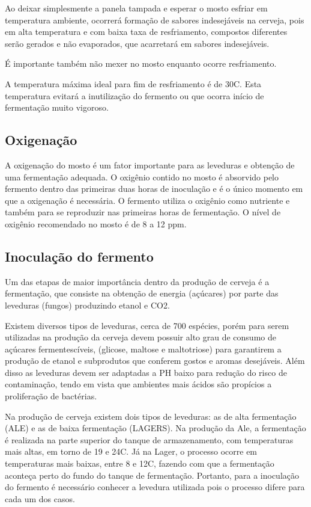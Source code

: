 Ao deixar simplesmente a panela tampada e esperar o mosto esfriar em temperatura ambiente, ocorrerá formação de sabores indesejáveis na cerveja, pois em alta temperatura e com baixa taxa de resfriamento, compostos diferentes serão gerados e não evaporados, que acarretará em sabores indesejáveis.

É importante também não mexer no mosto enquanto ocorre resfriamento.

A temperatura máxima ideal para fim de resfriamento é de 30\textdegree C. Esta temperatura evitará a inutilização do fermento ou que ocorra início de fermentação muito vigoroso.

\subsection{Oxigenação}
 A oxigenação do mosto é um fator importante para as leveduras e obtenção de uma fermentação adequada. O oxigênio contido no mosto é absorvido pelo fermento dentro das primeiras duas horas de inoculação e é o único momento em que a oxigenação é necessária. O fermento utiliza o oxigênio como nutriente e também para se reproduzir nas primeiras horas de fermentação. O nível de oxigênio recomendado no mosto é de 8 a 12 ppm.

 \subsection{Inoculação do fermento}

Um das etapas de maior importância dentro da produção de cerveja é a fermentação, que consiste na obtenção de energia (açúcares) por parte das leveduras (fungos) produzindo etanol e CO2.

Existem diversos tipos de leveduras, cerca de 700 espécies, porém para serem utilizadas na produção da cerveja devem possuir alto grau de consumo de açúcares fermentescíveis, (glicose, maltose e maltotriose) para garantirem a produção de etanol e subprodutos que conferem gostos e aromas desejáveis. Além disso as leveduras devem ser adaptadas a PH baixo para redução do risco de contaminação, tendo em vista que ambientes mais ácidos são propícios a proliferação de bactérias.

Na produção de cerveja existem dois tipos de leveduras: as de alta fermentação (ALE) e as de baixa fermentação (LAGERS). Na produção da Ale, a fermentação é realizada na parte superior do tanque de armazenamento, com temperaturas mais altas, em torno de 19 e 24\textdegree C. Já na Lager, o processo ocorre em temperaturas mais baixas, entre 8 e 12\textdegree C, fazendo com que a fermentação aconteça perto do fundo do tanque de fermentação. Portanto, para a inoculação do fermento é necessário conhecer a levedura utilizada pois o processo difere para cada um dos casos.

